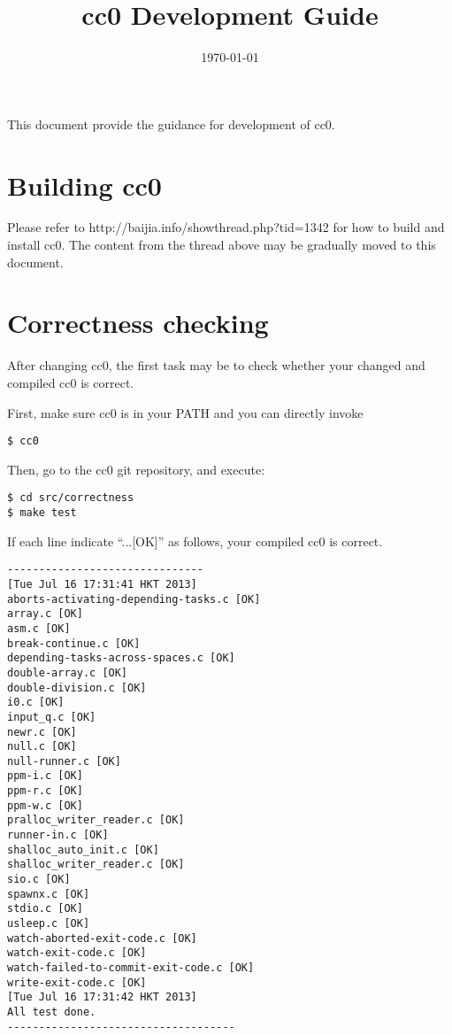 \documentclass[10pt]{article}
\title{cc0 Development Guide}
\author{
}
\date{\today}
\begin{document}
This document provide the guidance for development of cc0.

\section{Building cc0}

Please refer to http://baijia.info/showthread.php?tid=1342 for how to build and install cc0. The content from the thread above may be gradually moved to this document.

\section{Correctness checking}

After changing cc0, the first task may be to check whether your changed and compiled cc0 is correct.

First, make sure cc0 is in your PATH and you can directly invoke

\begin{verbatim}
$ cc0
\end{verbatim}

Then, go to the cc0 git repository, and execute:

\begin{verbatim}
$ cd src/correctness
$ make test
\end{verbatim}

If each line indicate ``...[OK]'' as follows, your compiled cc0 is correct.

\begin{verbatim}
-------------------------------
[Tue Jul 16 17:31:41 HKT 2013] 
aborts-activating-depending-tasks.c [OK]
array.c [OK]
asm.c [OK]
break-continue.c [OK]
depending-tasks-across-spaces.c [OK]
double-array.c [OK]
double-division.c [OK]
i0.c [OK]
input_q.c [OK]
newr.c [OK]
null.c [OK]
null-runner.c [OK]
ppm-i.c [OK]
ppm-r.c [OK]
ppm-w.c [OK]
pralloc_writer_reader.c [OK]
runner-in.c [OK]
shalloc_auto_init.c [OK]
shalloc_writer_reader.c [OK]
sio.c [OK]
spawnx.c [OK]
stdio.c [OK]
usleep.c [OK]
watch-aborted-exit-code.c [OK]
watch-exit-code.c [OK]
watch-failed-to-commit-exit-code.c [OK]
write-exit-code.c [OK]
[Tue Jul 16 17:31:42 HKT 2013] 
All test done.
------------------------------------
\end{verbatim}

\maketitle
\end{document}
